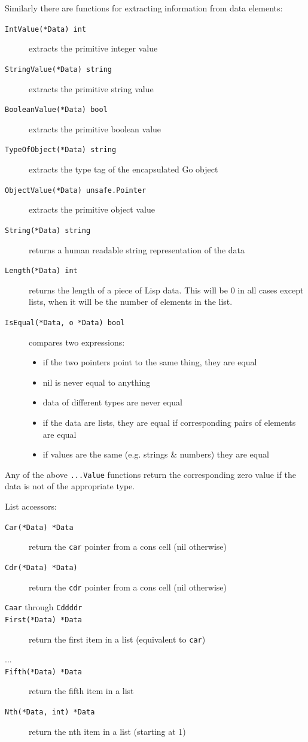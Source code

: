\documentclass[12pt]{article}
\begin{document}
\noindent Similarly there are functions for extracting information from data elements:

\begin{description}
\item [{\tt IntValue(*Data) int}] extracts the primitive integer value
\item [{\tt StringValue(*Data) string}] extracts the primitive
  string value
\item [{\tt BooleanValue(*Data) bool}] extracts the primitive
  boolean value
\item [{\tt TypeOfObject(*Data) string}] extracts the type tag of the
    encapsulated Go object
\item [{\tt ObjectValue(*Data) unsafe.Pointer}] extracts the
  primitive object value
\item [{\tt String(*Data) string}] returns a human readable string representation of the data
\item [{\tt Length(*Data) int}] returns the length of a piece of Lisp
  data. This will be 0 in all cases except lists, when it will be the
  number of elements in the list.
\item [{\tt IsEqual(*Data, o *Data) bool}] compares two expressions:
  \begin{itemize}
  \item if the two pointers point to the same thing, they are equal
  \item nil is never equal to anything
  \item data of different types are never equal
  \item if the data are lists, they are equal if corresponding pairs
    of elements are equal
  \item if values are the same (e.g. strings \& numbers) they are equal
  \end{itemize}
\end{description}

\noindent Any of the above \verb|...Value| functions return the corresponding zero value if the data is
not of the appropriate type.

\noindent List accessors:

\begin{description}
\item [{\tt Car(*Data) *Data}] return the \verb|car| pointer from a cons
  cell (nil otherwise)
\item [{\tt Cdr(*Data) *Data)}] return the \verb|cdr| pointer from a cons
  cell (nil otherwise)
\item [{\tt Caar} through {\tt Cddddr}]
\item [{\tt First(*Data) *Data}] return the first item in a list
  (equivalent to \verb|car|)
\item [...]
\item [{\tt Fifth(*Data) *Data}] return the fifth item in a list
\item [{\tt Nth(*Data, int) *Data}] return the nth item in a list
  (starting at 1)
\end{description}
\end{document}
